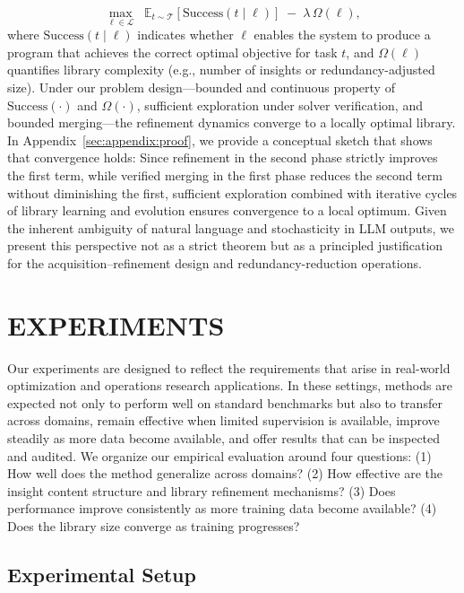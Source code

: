 \documentclass[sigconf, nonacm]{acmart}
\begin{document}
\[
\max_{\ell \in \mathcal{L}} \;\; \mathbb{E}_{t \sim \mathcal{T}}\!\left[ \mathrm{Success}(t \mid \ell) \right] \;-\; \lambda \,\Omega(\ell),
\]
where $\mathrm{Success}(t \mid \ell)$ indicates whether $\ell$ enables the system to produce a program that achieves the correct optimal objective for task $t$, and $\Omega(\ell)$ quantifies library complexity (e.g., number of insights or redundancy-adjusted size). Under our problem design---bounded and continuous property of $\text{Success}(\cdot)$ and $\Omega (\cdot)$, sufficient exploration under solver verification, and bounded merging---the refinement dynamics converge to a locally optimal library. In Appendix~\ref{sec:appendix:proof}, we provide a conceptual sketch that shows that convergence holds: Since refinement in the second phase strictly improves the first term, while verified merging in the first phase reduces the second term without diminishing the first, sufficient exploration combined with iterative cycles of library learning and evolution ensures convergence to a local optimum. Given the inherent ambiguity of natural language and stochasticity in LLM outputs, we present this perspective not as a strict theorem but as a principled justification for the acquisition–refinement design and redundancy-reduction operations.



\section{EXPERIMENTS}
\label{headings}

Our experiments are designed to reflect the requirements that arise in real-world optimization and operations research applications. In these settings, methods are expected not only to perform well on standard benchmarks but also to transfer across domains, remain effective when limited supervision is available, improve steadily as more data become available, and offer results that can be inspected and audited. We organize our empirical evaluation around four questions: (1) How well does the method generalize across domains? (2) How effective are the insight content structure and library refinement mechanisms? (3) Does performance improve consistently as more training data become available? (4) Does the library size converge as training progresses?

\subsection{Experimental Setup}
\end{document}
